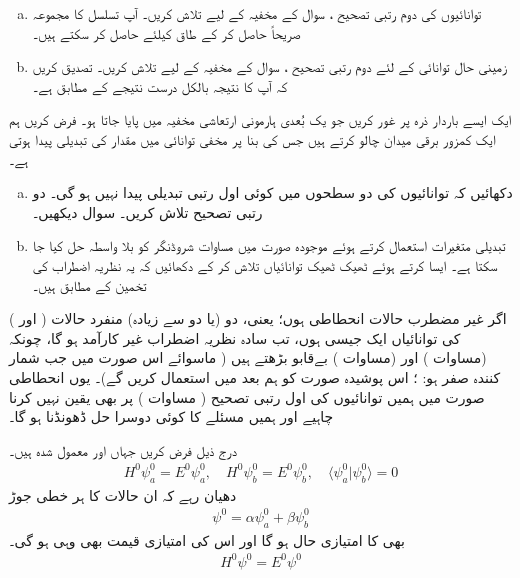 \begin{enumerate}[a.]
\item
توانائیوں کی دوم رتبی تصحیح ، سوال  کے مخفیہ کے لیے تلاش کریں۔  آپ تسلسل کا مجموعہ صریحاً حاصل کر کے طاق  کیلئے  حاصل کر سکتے ہیں۔
\item
زمینی حال توانائی کے لئے دوم رتبی تصحیح ، سوال  کے مخفیہ کے لیے تلاش کریں۔ تصدیق کریں کہ آپ کا نتیجہ بالکل درست نتیجے کے مطابق ہے۔ 
\end{enumerate}
ایک ایسے باردار ذرہ پر غور کریں جو یک بُعدی ہارمونی ارتعاشی مخفیہ میں پایا جاتا ہو۔ فرض کریں ہم ایک کمزور برقی میدان  چالو کرتے ہیں جس کی بنا پر مخفی توانائی میں  مقدار کی تبدیلی پیدا ہوتی ہے۔
\begin{enumerate}[a.]
\item
دکھائیں کہ توانائیوں کی دو سطحوں میں کوئی اول رتبی تبدیلی پیدا نہیں ہو گی۔ دو رتبی تصحیح تلاش کریں۔ سوال  دیکھیں۔
\item
تبدیلی متغیرات  استعمال کرتے ہوئے موجودہ صورت میں مساوات شروڈنگر کو بلا واسطہ حل کیا جا سکتا ہے۔ ایسا کرتے ہوئے ٹھیک ٹھیک توانائیاں تلاش کر کے دکھائیں کہ یہ نظریہ اضطراب کی تخمین کے مطابق ہیں۔
\end{enumerate}




اگر غیر مضطرب حالات انحطاطی ہوں؛ یعنی، دو (یا دو سے زیادہ) منفرد حالات (  اور ) کی توانائیاں ایک جیسی ہوں، تب سادہ نظریہ اضطراب غیر کارآمد ہو گا، چونکہ  (مساوات ) اور  (مساوات ) بےقابو بڑھتے ہیں ( ماسوائے اس صورت میں جب شمار کنندہ صفر ہو: ؛ اس پوشیدہ صورت کو ہم بعد میں استعمال کریں گے)۔ یوں انحطاطی صورت میں ہمیں توانائیوں کی اول رتبی تصحیح ( مساوات ) پر بھی یقین نہیں کرنا چاہیے اور ہمیں مسئلے کا کوئی دوسرا حل ڈھونڈنا ہو گا۔


درج ذیل فرض کریں جہاں  اور  معمول شدہ ہیں۔
\begin{align}\label{مساوات_غیر_مضطرب_دو_پڑتا_اضطراب}
H^0 \psi_a^0 = E^0 \psi_a^0, \quad H^0 \psi_b^0 = E^0 \psi_b^0, \quad \langle \psi_a^0 | \psi_b^0 \rangle = 0
\end{align}
دھیان رہے کہ ان حالات کا ہر خطی جوڑ 
\begin{align}\label{مساوات_غیر_مضطرب_دو_پڑتا_عمومی}
\psi^0 = \alpha \psi_a^0 + \beta \psi_b^0
\end{align}
بھی  کا امتیازی حال ہو گا اور اس کی امتیازی قیمت  بھی وہی ہو گی۔ 
\begin{align}\label{مساوات_غیر_مضطرب_دو_پڑتا_وہی_توانائی}
H^0 \psi^0 = E^0 \psi^0
\end{align}

